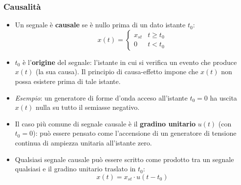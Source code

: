 \documentclass[12pt, a4paper]{article}
\begin{document}
\subsubsection{Causalità}
\begin{itemize}
    \item Un segnale è \textbf{causale} se è nullo prima di un dato istante $t_0$:
    $$x(t) = \begin{cases} x_{st} & t \ge t_0 \\ 0 & t < t_0\end{cases}$$
    \item $t_0$ è l'\textbf{origine} del segnale: l'istante in cui si verifica un evento che produce $x(t)$ (la sua causa). Il principio di causa-effetto impone che $x(t)$ non possa esistere prima di tale istante.
    \item \textit{Esempio}: un generatore di forme d'onda acceso all'istante $t_0=0$ ha uscita $x(t)$ nulla su tutto il semiasse negativo.
    \item Il caso più comune di segnale causale è il \textbf{gradino unitario} $u(t)$ (con $t_0=0$): può essere pensato come l'accensione di un generatore di tensione continua di ampiezza unitaria all'istante zero.
    \item Qualsiasi segnale causale può essere scritto come prodotto tra un segnale qualsiasi e il gradino unitario traslato in $t_0$:
    $$x(t) = x_{st}\cdot u(t-t_0)$$
\end{itemize}
\end{document}
